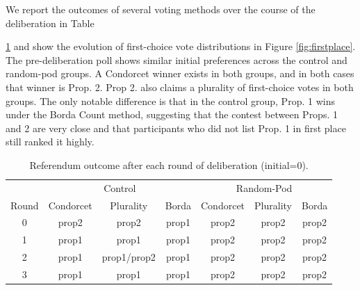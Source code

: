 We report the outcomes of several voting methods over the course of the deliberation in Table {\ref{tab:outcome} and show the evolution of first-choice vote distributions in Figure \ref{fig:firstplace}.
The pre-deliberation poll shows similar initial preferences across the control and random-pod groups.
A Condorcet winner exists in both groups, and in both cases that winner is Prop. 2.
Prop 2. also claims a plurality of first-choice votes in both groups.
The only notable difference is that in the control group, Prop. 1 wins under the Borda Count method, suggesting that the contest between Props. 1 and 2 are very close and that participants who did not list Prop. 1 in first place still ranked it highly.

\begin{table}[]
    \centering
    \begin{tabular}{c c c c c c c}
\hline
& \multicolumn{3}{c}{Control} & \multicolumn{3}{c}{Random-Pod} \\
\cmidrule(r){1-1}
\cmidrule(lr){2-4}
\cmidrule(l){5-7}
Round & Condorcet & Plurality & Borda &
Condorcet & Plurality & Borda \\
\cmidrule(r){1-1}
\cmidrule(lr){2-4}
\cmidrule(l){5-7}

0 & prop2 & prop2 & prop1 & 
prop2 & prop2 & prop2 \\

1 & prop1 & prop1 & prop1 &
prop2 & prop2 & prop2 \\

2 & prop1 & prop1/prop2 & prop1 &
prop2 & prop2 & prop2 \\

3 & prop1 & prop1 & prop1 &
prop2 & prop2 & prop2 \\
\hline
    \end{tabular}
    \caption{Referendum outcome after each round of deliberation (initial=0).}
    \label{tab:outcome}
\end{table}

}
